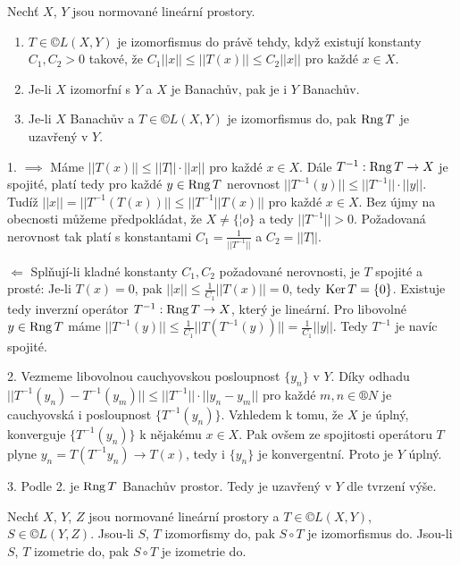\documentclass[12pt]{article}					%
\begin{document}
\begin{tvrzeni}
	Nechť $X$, $Y$ jsou normované lineární prostory.

	\begin{enumerate}
		\item $T \in ©L(X, Y)$ je izomorfismus do právě tehdy, když existují konstanty $C_1, C_2 > 0$ takové, že $C_1 ||x|| ≤ ||T(x)|| ≤ C_2 ||x||$ pro každé $x \in X$.
		\item Je-li $X$ izomorfní s $Y$ a $X$ je Banachův, pak je i $Y$ Banachův.
		\item Je-li $X$ Banachův a $T \in ©L(X, Y)$ je izomorfismus do, pak $\operatorname{Rng} T$ je uzavřený v $Y$.
	\end{enumerate}

	\begin{dukazin}[Ze skript]
		1. $\implies$ Máme $||T(x)|| ≤ ||T||·||x||$ pro každé $x \in X$. Dále $T^{-1}: \operatorname{Rng} T \rightarrow X$ je spojité, platí tedy pro každé $y \in \operatorname{Rng} T$ nerovnost $||T^{-1}(y)|| ≤ ||T^{-1}||·||y||$. Tudíž $||x|| = ||T^{-1}(T(x))|| ≤ ||T^{-1}||T(x)||$ pro každé $x \in X$. Bez újmy na obecnosti můžeme předpokládat, že $X ≠ \{¦o\}$ a tedy $||T^{-1}|| > 0$. Požadovaná nerovnost tak platí s konstantami $C_1 = \frac{1}{||T^{-1}||}$ a $C_2 = ||T||$.

		$\Leftarrow$ Splňují-li kladné konstanty $C_1, C_2$ požadované nerovnosti, je $T$ spojité a prosté: Je-li $T(x) = 0$, pak $||x|| ≤ \frac{1}{C_1}||T(x)|| = 0$, tedy $\operatorname{Ker} T = \{0\}$. Existuje tedy inverzní operátor $T^{-1}: \operatorname{Rng} T \rightarrow X$, který je lineární. Pro libovolné $y \in \operatorname{Rng} T$ máme $||T^{-1}(y)|| ≤ \frac{1}{C_1}||T(T^{-1}(y))|| = \frac{1}{C_1}||y||$. Tedy $T^{-1}$ je navíc spojité.

		2. Vezmeme libovolnou cauchyovskou posloupnost $\{y_n\}$ v $Y$. Díky odhadu $||T^{-1}(y_n) - T^{-1}(y_m)|| ≤ ||T^{-1}||·||y_n - y_m||$ pro každé $m, n \in ®N$ je cauchyovská i posloupnost $\{T^{-1}(y_n)\}$. Vzhledem k tomu, že $X$ je úplný, konverguje $\{T^{-1}(y_n)\}$ k nějakému $x \in X$. Pak ovšem ze spojitosti operátoru $T$ plyne $y_n = T(T^{-1}y_n) \rightarrow T(x)$, tedy i $\{y_n\}$ je konvergentní. Proto je $Y$ úplný.

		3. Podle 2. je $\operatorname{Rng} T$ Banachův prostor. Tedy je uzavřený v $Y$ dle tvrzení výše.
	\end{dukazin}
\end{tvrzeni}

\begin{poznamka}[Fakt]
	Nechť $X$, $Y$, $Z$ jsou normované lineární prostory a $T \in ©L(X, Y)$, $S \in ©L(Y, Z)$. Jsou-li $S$, $T$ izomorfismy do, pak $S \circ T$ je izomorfismus do. Jsou-li $S$, $T$ izometrie do, pak $S \circ T$ je izometrie do.
\end{poznamka}
\end{document}
